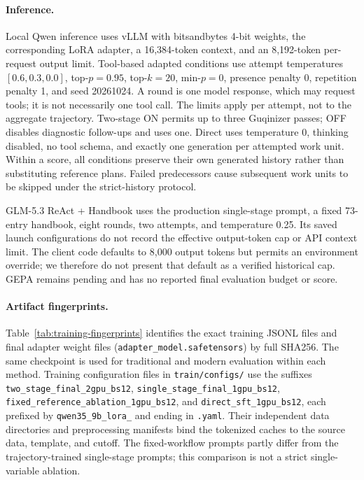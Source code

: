 \paragraph{Inference.}
Local Qwen inference uses vLLM with bitsandbytes 4-bit weights, the corresponding LoRA adapter, a 16,384-token context, and an 8,192-token per-request output limit. Tool-based adapted conditions use attempt temperatures $[0.6,0.3,0.0]$, top-$p=0.95$, top-$k=20$, min-$p=0$, presence penalty 0, repetition penalty 1, and seed 20261024. A round is one model response, which may request tools; it is not necessarily one tool call. The limits apply per attempt, not to the aggregate trajectory. Two-stage ON permits up to three Guqinizer passes; OFF disables diagnostic follow-ups and uses one. Direct uses temperature 0, thinking disabled, no tool schema, and exactly one generation per attempted work unit. Within a score, all conditions preserve their own generated history rather than substituting reference plans. Failed predecessors cause subsequent work units to be skipped under the strict-history protocol.

GLM-5.3 ReAct + Handbook uses the production single-stage prompt, a fixed 73-entry handbook, eight rounds, two attempts, and temperature 0.25. Its saved launch configurations do not record the effective output-token cap or API context limit. The client code defaults to 8,000 output tokens but permits an environment override; we therefore do not present that default as a verified historical cap. GEPA remains pending and has no reported final evaluation budget or score.

\paragraph{Artifact fingerprints.}
Table~\ref{tab:training-fingerprints} identifies the exact training JSONL files and final adapter weight files (\texttt{adapter\_model.safetensors}) by full SHA256. The same checkpoint is used for traditional and modern evaluation within each method. Training configuration files in \texttt{train/configs/} use the suffixes \texttt{two\_stage\_final\_2gpu\_bs12}, \texttt{single\_stage\_final\_1gpu\_bs12}, \texttt{fixed\_reference\_ablation\_1gpu\_bs12}, and \texttt{direct\_sft\_1gpu\_bs12}, each prefixed by \texttt{qwen35\_9b\_lora\_} and ending in \texttt{.yaml}. Their independent data directories and preprocessing manifests bind the tokenized caches to the source data, template, and cutoff. The fixed-workflow prompts partly differ from the trajectory-trained single-stage prompts; this comparison is not a strict single-variable ablation.

